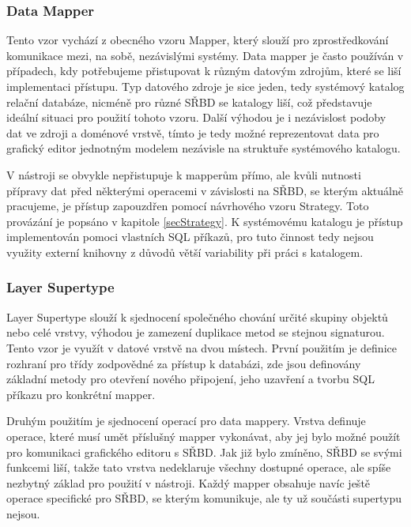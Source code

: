 \documentclass[czech,bachelor,public,dept460,male,oneside]{diploma}
\begin{document}
		\subsubsection{Data Mapper}
		Tento vzor vychází z obecného vzoru Mapper, který slouží pro zprostředkování komunikace mezi, na sobě, nezávislými systémy. Data mapper je často používán v případech, kdy potřebujeme přistupovat k různým datovým zdrojům, které se liší implementaci přístupu. Typ datového zdroje je sice jeden, tedy systémový katalog relační databáze, nicméně pro různé SŘBD se katalogy liší, což představuje ideální situaci pro použití tohoto vzoru. Další výhodou je i nezávislost podoby dat ve zdroji a doménové vrstvě, tímto je tedy možné reprezentovat data pro grafický editor jednotným modelem nezávisle na struktuře systémového katalogu.
		
		V nástroji se obvykle nepřistupuje k mapperům přímo, ale kvůli nutnosti přípravy dat před některými operacemi v závislosti na SŘBD, se kterým aktuálně pracujeme, je přístup zapouzdřen pomocí návrhového vzoru Strategy. Toto provázání je popsáno v kapitole \ref{secStrategy}. K systémovému katalogu je přístup implementován pomoci vlastních SQL příkazů, pro tuto činnost tedy nejsou využity externí knihovny z důvodů větší variability při práci s katalogem.
		
		\subsubsection{Layer Supertype}
		Layer Supertype slouží k sjednocení společného chování určité skupiny objektů nebo celé vrstvy, výhodou je zamezení duplikace metod se stejnou signaturou. Tento vzor je využít v datové vrstvě na dvou místech. První použitím je definice rozhraní pro třídy zodpovědné za přístup k databázi, zde jsou definovány základní metody pro otevření nového připojení, jeho uzavření a tvorbu SQL příkazu pro konkrétní mapper. 
		
		Druhým použitím je sjednocení operací pro data mappery. Vrstva definuje operace, které musí umět příslušný mapper vykonávat, aby jej bylo možné použít pro komunikaci grafického editoru s SŘBD. Jak již bylo zmíněno, SŘBD se svými funkcemi liší, takže tato vrstva nedeklaruje všechny dostupné operace, ale spíše nezbytný základ pro použití v nástroji. Každý mapper obsahuje navíc ještě operace specifické pro SŘBD, se kterým komunikuje, ale ty už součásti supertypu nejsou.
	
\end{document}
